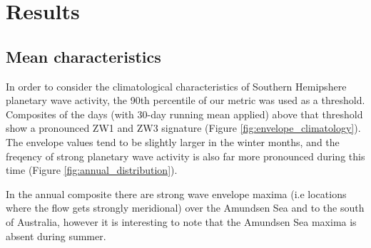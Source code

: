 \section{Results}

\subsection{Mean characteristics}

In order to consider the climatological characteristics of Southern Hemipshere planetary wave activity, the 90th percentile of our metric was used as a threshold. Composites of the days (with 30-day running mean applied) above that threshold show a pronounced ZW1 and ZW3 signature (Figure \ref{fig:envelope_climatology}). The envelope values tend to be slightly larger in the winter months, and the freqency of strong planetary wave activity is also far more pronounced during this time (Figure \ref{fig:annual_distribution}).


In the annual composite there are strong wave envelope maxima (i.e locations where the flow gets strongly meridional) over the Amundsen Sea and to the south of Australia, however it is interesting to note that the Amundsen Sea maxima is absent during summer.   



